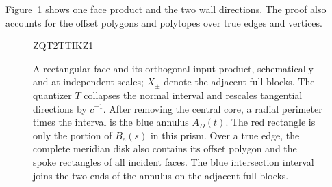\documentclass[11pt]{article}
\numberwithin{equation}{section}
\theoremstyle{definition}
\theoremstyle{remark}
\begin{document}
Figure~\ref{qt:fig-product-exterior} shows one face product and the
two wall directions.  The proof also accounts for the offset polygons
and polytopes over true edges and vertices.

\begin{figure}[tb]

ZQT2TTIKZ1
\caption{A rectangular face and its orthogonal input product,
schematically and at independent scales; $X_\pm$ denote the adjacent
full blocks.  The quantizer $T$ collapses
the normal interval and rescales tangential directions by $c^{-1}$.
After removing the central core, a radial perimeter times the interval
is the blue annulus $A_D(t)$.  The red rectangle is only the portion
of $B_e(s)$ in this prism.  Over a true edge, the complete meridian
disk also contains its offset polygon and the spoke rectangles of all
incident faces.  The blue intersection interval joins the two ends
of the annulus on the adjacent full blocks.}
\label{qt:fig-product-exterior}
\end{figure}
\end{document}
